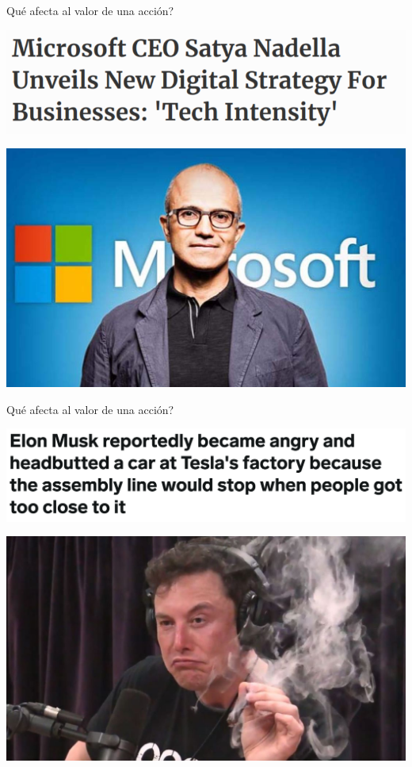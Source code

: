 \documentclass[12pt,aspectratio=169]{beamer}
\begin{document}
\begin{frame}{Qué afecta al valor de una acción?}
\begin{center}
	\includegraphics[width=.5\paperwidth]{microsoftbusiness.png}
	
	\includegraphics[width=.5\paperwidth]{satyanadella.jpeg}
\end{center}
\end{frame}


\begin{frame}{Qué afecta al valor de una acción?}
\begin{center}
	\includegraphics[width=.65\paperwidth]{elonbusiness.png}

	\includegraphics[width=.5\paperwidth]{elonweed.jpg}
\end{center}
\end{frame}
\end{document}
